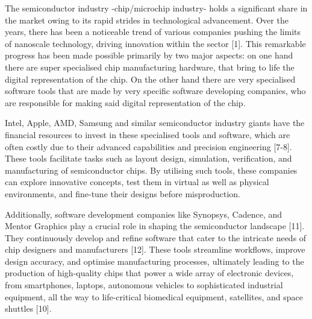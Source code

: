The semiconductor industry -chip/microchip industry- holds a significant share in the market owing to its rapid strides in technological advancement. Over the years, there has been a noticeable trend of various companies pushing the limits of nanoscale technology, driving innovation within the sector [1]. This remarkable progress has been made possible primarily by two major aspects: on one hand there are  super specialised chip manufacturing hardware, that bring to life the digital representation of the chip. On the other hand there are very specialised software tools that are made by very specific software developing companies, who are responsible for making said digital representation of the chip. 

Intel, Apple, AMD, Samsung and similar semiconductor industry giants have the financial resources to invest in these specialised tools and software, which are often costly due to their advanced capabilities and precision engineering [7-8]. These tools facilitate tasks such as layout design, simulation, verification, and manufacturing of semiconductor chips. By utilising such tools, these companies can explore innovative concepts, test them in virtual as well as physical environments, and fine-tune their designs before misproduction.

Additionally, software development companies like Synopsys, Cadence, and Mentor Graphics play a crucial role in shaping the semiconductor landscape [11]. They continuously develop and refine software that cater to the intricate needs of chip designers and manufacturers [12]. These tools streamline workflows, improve design accuracy, and optimise manufacturing processes, ultimately leading to the production of high-quality chips that power a wide array of electronic devices, from smartphones, laptops, autonomous vehicles to sophisticated industrial equipment, all the way to life-critical biomedical equipment, satellites, and space shuttles [10]. 

